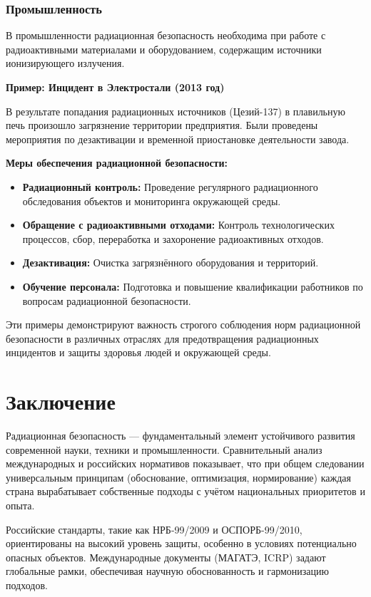 \documentclass[a4paper, 14pt]{extarticle}
\begin{document}
\subsubsection*{Промышленность}

В промышленности радиационная безопасность необходима при работе с радиоактивными материалами и оборудованием, содержащим источники ионизирующего излучения.

\textbf{Пример: Инцидент в Электростали (2013 год)}

В результате попадания радиационных источников (Цезий-137) в плавильную печь произошло загрязнение территории предприятия. Были проведены мероприятия по дезактивации и временной приостановке деятельности завода.


\textbf{Меры обеспечения радиационной безопасности:}
\begin{itemize}
    \item \textbf{Радиационный контроль:} Проведение регулярного радиационного обследования объектов и мониторинга окружающей среды.
    \item \textbf{Обращение с радиоактивными отходами:} Контроль технологических процессов, сбор, переработка и захоронение радиоактивных отходов.
    \item \textbf{Дезактивация:} Очистка загрязнённого оборудования и территорий.
    \item \textbf{Обучение персонала:} Подготовка и повышение квалификации работников по вопросам радиационной безопасности.
\end{itemize}


Эти примеры демонстрируют важность строгого соблюдения норм радиационной безопасности в различных отраслях для предотвращения радиационных инцидентов и защиты здоровья людей и окружающей среды.

\section{Заключение}

Радиационная безопасность — фундаментальный элемент устойчивого развития современной науки, техники и промышленности. Сравнительный анализ международных и российских нормативов показывает, что при общем следовании универсальным принципам (обоснование, оптимизация, нормирование) каждая страна вырабатывает собственные подходы с учётом национальных приоритетов и опыта.

Российские стандарты, такие как НРБ-99/2009 и ОСПОРБ-99/2010, ориентированы на высокий уровень защиты, особенно в условиях потенциально опасных объектов. Международные документы (МАГАТЭ, ICRP) задают глобальные рамки, обеспечивая научную обоснованность и гармонизацию подходов.
\end{document}
